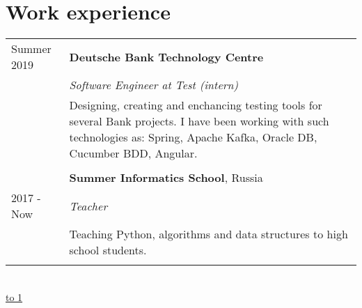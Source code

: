 \documentclass[10pt]{article}
\def\LINE{\vspace*{-1em}\noindent \underline{\hbox to 1\textwidth{{ } \hfil{ } \hfil{ } }}}
\begin{document}
\section*{\color{accent} Work experience}
\begin{tabular}{p{2.5cm}|p{14cm}}

  Summer 2019 & \textbf{Deutsche Bank Technology Centre} \\
    & \emph{Software Engineer at Test (intern)}\\
  & \footnotesize{Designing, creating and enchancing testing tools for several Bank projects. \newline I have been working with such technologies as: Spring, Apache Kafka, Oracle DB, Cucumber BDD, Angular.}\\
  \\
   \  & \textbf{Summer Informatics School}, Russia \\
   2017 - Now &\emph{Teacher}\\
   \  &\footnotesize{Teaching Python, algorithms and data structures to high school students.}\\\multicolumn{2}{c}{} \\
\end{tabular}
\\
\LINE
\end{document}
